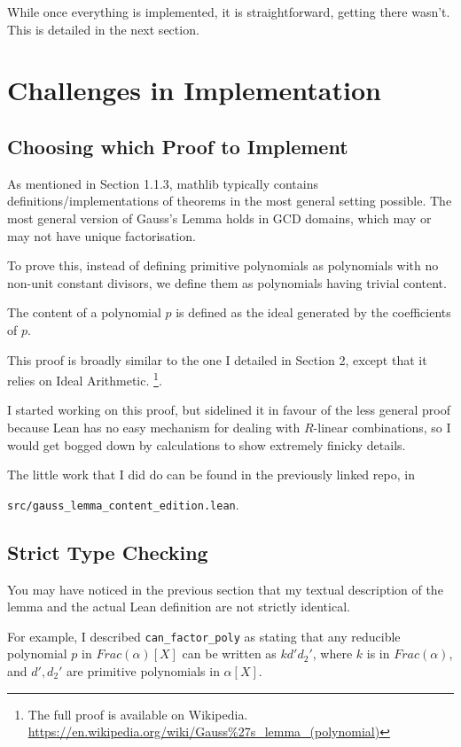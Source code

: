 \documentclass[pagesize=a4]{scrreprt}
\begin{document}
While once everything is implemented, it is straightforward, getting there wasn't.  This is detailed in the next section. 

\chapter{Challenges in Implementation}

\section{Choosing which Proof to Implement}

As mentioned in Section 1.1.3, mathlib typically contains definitions/implementations of theorems in the most general setting possible. The most general version of Gauss's Lemma holds in GCD domains, which may or may not have unique factorisation. 

To prove this, instead of defining primitive polynomials as polynomials with no non-unit constant divisors, we define them as polynomials having trivial content. 

The content of a polynomial $p$ is defined as the ideal generated by the coefficients of $p$. 

This proof is broadly similar to the one I detailed in Section 2, except that it relies on Ideal Arithmetic. \footnote{The full proof is available on Wikipedia. \url{https://en.wikipedia.org/wiki/Gauss\%27s\_lemma\_(polynomial)}}. 

I started working on this proof, but sidelined it in favour of the less general proof because Lean has no easy mechanism for dealing with $R$-linear combinations, so I would get bogged down by calculations to show extremely finicky details. 

The little work that I did do can be found in the previously linked repo, in 

\texttt{src/gauss\_lemma\_content\_edition.lean}. 


\section{Strict Type Checking}

You may have noticed in the previous section that my textual description of the lemma and the actual Lean definition are not strictly identical. 

For example, I described \texttt{can\_factor\_poly} as stating that any reducible polynomial $p$ in $Frac(\alpha)[X]$ can be written as $kd'd_2'$, where $k$ is in $Frac(\alpha)$, and $d', d_2'$ are primitive polynomials in $ \alpha[X]$. 
\end{document}
